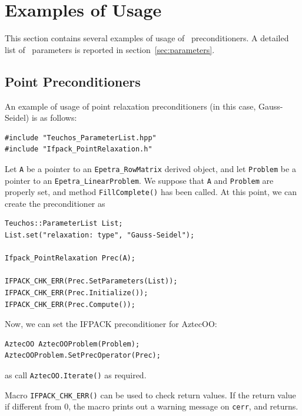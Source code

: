 \section{Examples of Usage}
\label{sec:usage}

This section contains several examples of usage of \ifpack\ preconditioners. A
detailed list of \ifpack\ parameters is reported in
section~\ref{sec:parameters}.

\subsection{Point Preconditioners}
\label{sec:point_ex}

An example of usage of point relaxation preconditioners (in this case, Gauss-Seidel) is as
follows:
\begin{verbatim}
#include "Teuchos_ParameterList.hpp"
#include "Ifpack_PointRelaxation.h"
\end{verbatim}
Let \verb!A! be a pointer to an \verb!Epetra_RowMatrix! derived object,
  and let \verb!Problem! be a pointer to an \verb!Epetra_LinearProblem!.
We suppose that \verb!A! and 
\verb!Problem! are properly set, and
method \verb~FillComplete()~ has been called. At this point, we can create the
preconditioner as
\begin{verbatim}
Teuchos::ParameterList List;
List.set("relaxation: type", "Gauss-Seidel");

Ifpack_PointRelaxation Prec(A);

IFPACK_CHK_ERR(Prec.SetParameters(List));
IFPACK_CHK_ERR(Prec.Initialize());
IFPACK_CHK_ERR(Prec.Compute());
\end{verbatim}
Now, we can set the IFPACK preconditioner for AztecOO:
\begin{verbatim}
AztecOO AztecOOProblem(Problem);
AztecOOProblem.SetPrecOperator(Prec);
\end{verbatim}
as call \verb!AztecOO.Iterate()! as required.

Macro \verb!IFPACK_CHK_ERR()! can be used to check return values. If the
return value if different from 0, the macro prints out a warning message on
\verb!cerr!, and returns.

